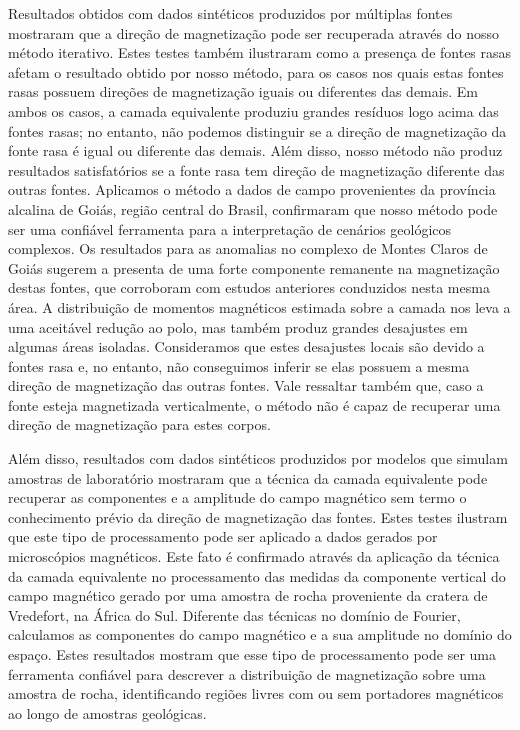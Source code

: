 Resultados obtidos com dados sintéticos produzidos por múltiplas fontes mostraram que a direção de magnetização pode ser recuperada através do nosso método iterativo. Estes testes também ilustraram como a presença de fontes rasas afetam o resultado obtido por nosso método, para os casos nos quais estas fontes rasas possuem direções de magnetização iguais ou diferentes das demais. Em ambos os casos, a camada equivalente produziu grandes resíduos logo acima das fontes rasas; no entanto, não podemos distinguir se a direção de magnetização da fonte rasa é igual ou diferente das demais. Além disso, nosso método não produz resultados satisfatórios se a fonte rasa tem direção de magnetização diferente das outras fontes. Aplicamos o método a dados de campo provenientes da província alcalina de Goiás, região central do Brasil, confirmaram que nosso método pode ser uma confiável ferramenta para a interpretação de cenários geológicos complexos. Os resultados para as anomalias no complexo de Montes Claros de Goiás sugerem a presenta de uma forte componente remanente na magnetização destas fontes, que corroboram com estudos anteriores conduzidos nesta mesma área. A distribuição de momentos magnéticos estimada sobre a camada nos leva a uma aceitável redução ao polo, mas também produz grandes desajustes em algumas áreas isoladas. Consideramos que estes desajustes locais são devido a fontes rasa e, no entanto, não conseguimos inferir se elas possuem a mesma direção de magnetização das outras fontes. Vale ressaltar também que, caso a fonte esteja magnetizada verticalmente, o método não é capaz de recuperar uma direção de magnetização para estes corpos.  

Além disso, resultados com dados sintéticos produzidos por modelos que simulam amostras de laboratório mostraram que a técnica da camada equivalente pode recuperar as componentes e a amplitude do campo magnético sem termo o conhecimento prévio da direção de magnetização das fontes. Estes testes ilustram que este tipo de processamento pode ser aplicado a dados gerados por microscópios magnéticos. Este fato é confirmado através da aplicação da técnica da camada equivalente no processamento das medidas da componente vertical do campo magnético gerado por uma amostra de rocha proveniente da cratera de Vredefort, na África do Sul. Diferente das técnicas no domínio de Fourier, calculamos as componentes do campo magnético e a sua amplitude no domínio do espaço. Estes resultados mostram que esse tipo de processamento pode ser uma ferramenta confiável para descrever a distribuição de magnetização sobre uma amostra de rocha, identificando regiões livres com ou sem portadores magnéticos ao longo de amostras geológicas.

